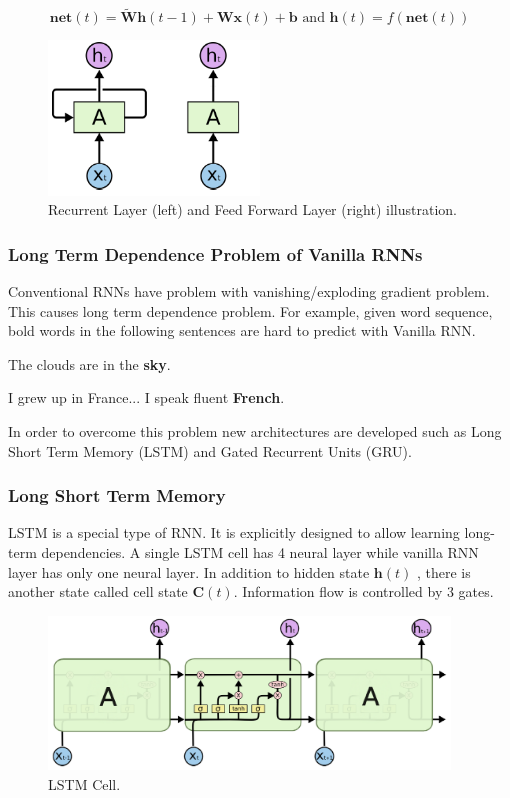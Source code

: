 \begin{equation}
\label{eqn:rnnact}
\boldsymbol{net}(t) = \boldsymbol{\tilde{W}} \boldsymbol{h}(t-1) + \boldsymbol{W} \boldsymbol{x}(t) + \boldsymbol{b} \text{ and } \boldsymbol{h}(t) = f(\boldsymbol{net}(t))
\end{equation}


\begin{figure}
	\centering
	\includegraphics[width=0.5\textwidth]{figures/ml_theory/rnn_vs_ffnn_layer.png}
	\caption{Recurrent Layer (left) and Feed Forward Layer (right) illustration.}
	\label{fig:rnn_vs_ffnn}
\end{figure}

\subsubsection{Long Term Dependence Problem of Vanilla RNNs}
Conventional RNNs have problem with vanishing/exploding gradient problem. This causes long term dependence problem. For example, given word sequence, bold words in the following sentences are hard to predict with Vanilla RNN.

\centerline{The clouds are in the \textbf{sky}.}
\centerline{I grew up in France... I speak fluent \textbf{French}.}

In order to overcome this problem new architectures are developed such as Long Short Term Memory (LSTM) and Gated Recurrent Units (GRU).

\subsubsection{Long Short Term Memory}
LSTM is a special type of RNN. It is explicitly designed to allow learning long-term dependencies. A single LSTM cell has 4 neural layer while vanilla RNN layer has only one neural layer. In addition to hidden state $\boldsymbol{h}(t)$ , there is another state called cell state $\boldsymbol{C}(t)$. Information flow is controlled by 3 gates. 

\begin{figure}
	\centering
	\includegraphics[width=0.95\textwidth]{figures/ml_theory/lstm/lstm_module.png}
	\caption{LSTM Cell.}
	\label{fig:lstm_cell}
\end{figure}

